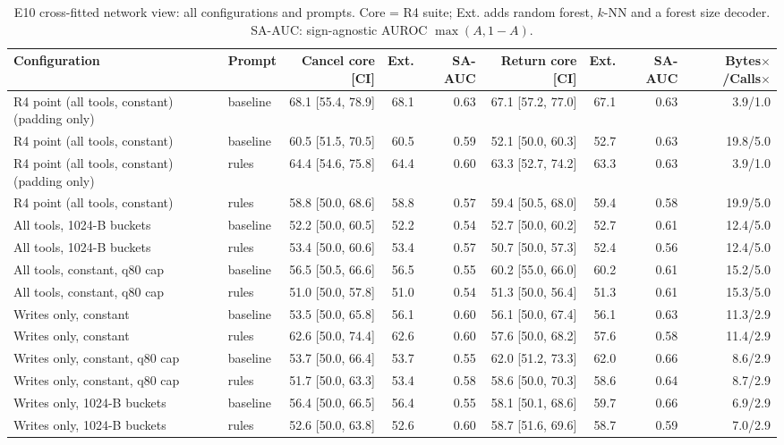 \begin{table}[ht]\centering\footnotesize\setlength{\tabcolsep}{3pt}
\caption{E10 cross-fitted network view: all configurations and prompts. Core = R4 suite; Ext. adds random forest, $k$-NN and a forest size decoder. SA-AUC: sign-agnostic AUROC $\max(A,1-A)$.}
\begin{tabular}{@{}llrrrrrrr@{}}\toprule
Configuration & Prompt & Cancel core [CI] & Ext. & SA-AUC & Return core [CI] & Ext. & SA-AUC & Bytes$\times$/Calls$\times$\\\midrule
R4 point (all tools, constant) (padding only) & baseline & 68.1 [55.4, 78.9] & 68.1 & 0.63 & 67.1 [57.2, 77.0] & 67.1 & 0.63 & 3.9/1.0\\
R4 point (all tools, constant) & baseline & 60.5 [51.5, 70.5] & 60.5 & 0.59 & 52.1 [50.0, 60.3] & 52.7 & 0.63 & 19.8/5.0\\
R4 point (all tools, constant) (padding only) & rules & 64.4 [54.6, 75.8] & 64.4 & 0.60 & 63.3 [52.7, 74.2] & 63.3 & 0.63 & 3.9/1.0\\
R4 point (all tools, constant) & rules & 58.8 [50.0, 68.6] & 58.8 & 0.57 & 59.4 [50.5, 68.0] & 59.4 & 0.58 & 19.9/5.0\\
All tools, 1024-B buckets & baseline & 52.2 [50.0, 60.5] & 52.2 & 0.54 & 52.7 [50.0, 60.2] & 52.7 & 0.61 & 12.4/5.0\\
All tools, 1024-B buckets & rules & 53.4 [50.0, 60.6] & 53.4 & 0.57 & 50.7 [50.0, 57.3] & 52.4 & 0.56 & 12.4/5.0\\
All tools, constant, q80 cap & baseline & 56.5 [50.5, 66.6] & 56.5 & 0.55 & 60.2 [55.0, 66.0] & 60.2 & 0.61 & 15.2/5.0\\
All tools, constant, q80 cap & rules & 51.0 [50.0, 57.8] & 51.0 & 0.54 & 51.3 [50.0, 56.4] & 51.3 & 0.61 & 15.3/5.0\\
Writes only, constant & baseline & 53.5 [50.0, 65.8] & 56.1 & 0.60 & 56.1 [50.0, 67.4] & 56.1 & 0.63 & 11.3/2.9\\
Writes only, constant & rules & 62.6 [50.0, 74.4] & 62.6 & 0.60 & 57.6 [50.0, 68.2] & 57.6 & 0.58 & 11.4/2.9\\
Writes only, constant, q80 cap & baseline & 53.7 [50.0, 66.4] & 53.7 & 0.55 & 62.0 [51.2, 73.3] & 62.0 & 0.66 & 8.6/2.9\\
Writes only, constant, q80 cap & rules & 51.7 [50.0, 63.3] & 53.4 & 0.58 & 58.6 [50.0, 70.3] & 58.6 & 0.64 & 8.7/2.9\\
Writes only, 1024-B buckets & baseline & 56.4 [50.0, 66.5] & 56.4 & 0.55 & 58.1 [50.1, 68.6] & 59.7 & 0.66 & 6.9/2.9\\
Writes only, 1024-B buckets & rules & 52.6 [50.0, 63.8] & 52.6 & 0.60 & 58.7 [51.6, 69.6] & 58.7 & 0.59 & 7.0/2.9\\
\bottomrule\end{tabular}\end{table}

